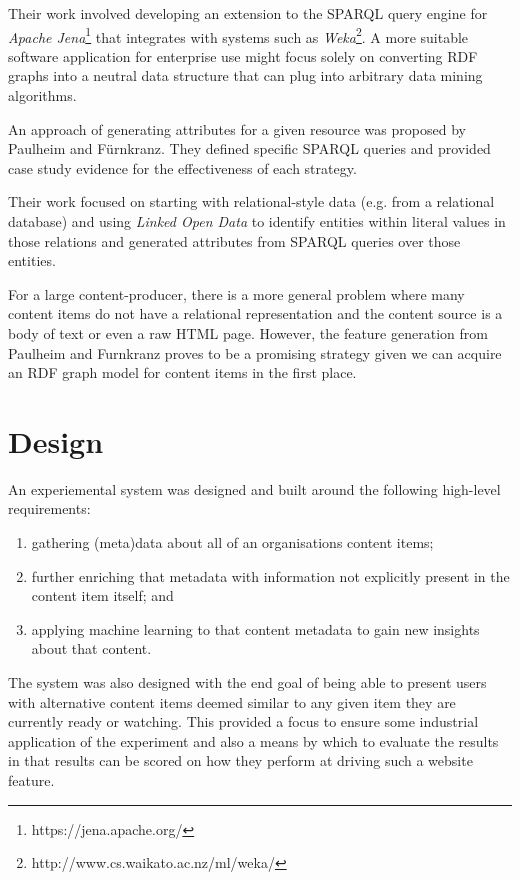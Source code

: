\documentclass{sig-alternate-05-2015}
\begin{document}
Their work involved developing an extension to the SPARQL query
engine for \emph{Apache Jena}\footnote{https://jena.apache.org/} that integrates
with systems such as \emph{Weka}\footnote{http://www.cs.waikato.ac.nz/ml/weka/}.
A more suitable software application for enterprise use might focus solely on
converting RDF graphs into a neutral data structure that can plug into arbitrary
data mining algorithms.

An approach of generating attributes for a given resource was proposed by
Paulheim and F\"urnkranz\cite{paulheim2012unsupervised}. They defined specific
SPARQL queries and provided case study evidence for the effectiveness of
each strategy.

Their work focused on starting with relational-style data (e.g. from a
relational database) and using \emph{Linked Open Data} to identify entities
within literal values in those relations and generated attributes from
SPARQL queries over those entities.

For a large content-producer, there is a more general problem where many content
items do not have a relational representation and the content source is a body
of text or even a raw HTML page. However, the feature generation from Paulheim
and F\:urnkranz proves to be a promising strategy given we can acquire an RDF
graph model for content items in the first place.

\section{Design}

An experiemental system was designed and built around the following
high-level requirements:

\begin{enumerate}
\item gathering (meta)data about all of an organisations content items;
\item further enriching that metadata with information not explicitly present
in the content item itself; and
\item applying machine learning to that content metadata to gain new insights
about that content.
\end{enumerate}

The system was also designed with the end goal of being able to present
users with alternative content items deemed similar to any given item they
are currently ready or watching. This provided a focus to ensure some
industrial application of the experiment and also a means by which to evaluate
the results in that results can be scored on how they perform at driving
such a website feature.
\end{document}
